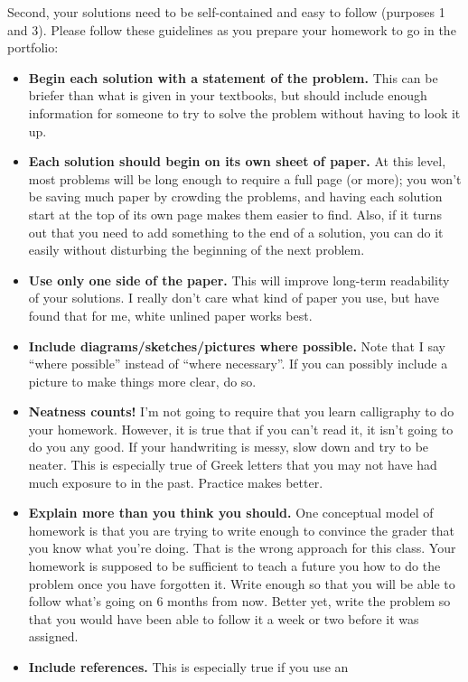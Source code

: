 \documentclass{article}
\begin{document}
Second, your solutions need to be self-contained and easy to follow
(purposes 1 and 3).  Please follow these guidelines as you prepare
your homework to go in the portfolio:
\begin{itemize}
\item{\bf Begin each solution with a statement of the problem.} This
  can be briefer than what is given in your textbooks, but should
  include enough information for someone to try to solve the problem
  without having to look it up.
\item{\bf Each solution should begin on its own sheet of paper.}  At
  this level, most problems will be long enough to require a full page
  (or more); you won't be saving much paper by crowding the problems,
  and having each solution start at the top of its own page makes them
  easier to find.  Also, if it turns out that you need to add
  something to the end of a solution, you can do it easily without
  disturbing the beginning of the next problem.
\item{\bf Use only one side of the paper.}  This will improve
  long-term readability of your solutions.  I really don't care what
  kind of paper you use, but have found that for me, white unlined
  paper works best.
\item{\bf Include diagrams/sketches/pictures where possible.}  Note
  that I say ``where possible'' instead of ``where necessary''.  If
  you can possibly include a picture to make things more clear, do so.
\item{\bf Neatness counts!}  I'm not going to require that you learn
  calligraphy to do your homework.  However, it is true that if you
  can't read it, it isn't going to do you any good.  If your
  handwriting is messy, slow down and try to be neater.  This is
  especially true of Greek letters that you may not have had much
  exposure to in the past.  Practice makes better.
\item{\bf Explain more than you think you should.}  One conceptual
  model of homework is that you are trying to write enough to convince
  the grader that you know what you're doing.  That is the wrong
  approach for this class.  Your homework is supposed to be sufficient
  to teach a future you how to do the problem once you have forgotten
  it.  Write enough so that you will be able to follow what's going on
  6 months from now.  Better yet, write the problem so that you would
  have been able to follow it a week or two before it was assigned.
\item{\bf Include references.}  This is especially true if you use an

\end{itemize}
\end{document}
